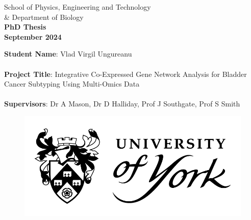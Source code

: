 \begin{titlepage} 
  \begin{center} 
    
    	\large School of Physics, Engineering and Technology \\ \& Department of Biology \\
        \vspace{2.0cm}
		\Huge \textbf{PhD Thesis} \\
        \vspace{0.2cm}
        \large \textbf{September 2024} \\

        \vspace{2.0cm}
            
       \begin{flushleft}
        \large \textbf{Student Name}: Vlad Virgil Ungureanu \\~\\
        \large \textbf{Project Title}: Integrative Co-Expressed Gene Network Analysis for Bladder Cancer Subtyping Using Multi-Omics Data \\~\\
        \large \textbf{Supervisors}: Dr A Mason, Dr D Halliday, Prof J Southgate, Prof S Smith
 
       \end{flushleft} 
            
           \begin{figure}[t]
          	\includegraphics[scale=0.45]{Images/UOY_logo.png}
          \end{figure}
                  
 \end{center} 

\end{titlepage}